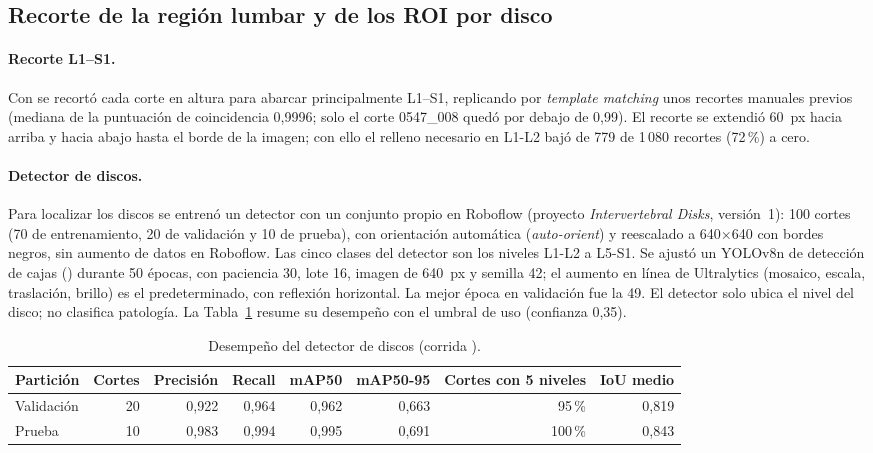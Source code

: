 \subsection{Recorte de la región lumbar y de los ROI por disco}
\label{sec:roi}
\paragraph{Recorte L1--S1.} Con  se recortó cada corte en altura para abarcar principalmente L1--S1, replicando por \emph{template matching} unos recortes manuales previos (mediana de la puntuación de coincidencia 0,9996; solo el corte 0547\_008 quedó por debajo de 0,99). El recorte se extendió 60~px hacia arriba y hacia abajo hasta el borde de la imagen; con ello el relleno necesario en L1-L2 bajó de 779 de 1\,080 recortes (72\,\%) a cero.

\paragraph{Detector de discos.} Para localizar los discos se entrenó un detector con un conjunto propio en Roboflow (proyecto \emph{Intervertebral Disks}, versión~1): 100 cortes (70 de entrenamiento, 20 de validación y 10 de prueba), con orientación automática (\emph{auto-orient}) y reescalado a 640$\times$640 con bordes negros, sin aumento de datos en Roboflow. Las cinco clases del detector son los niveles L1-L2 a L5-S1. Se ajustó un YOLOv8n de detección de cajas () durante 50 épocas, con paciencia 30, lote 16, imagen de 640~px y semilla 42; el aumento en línea de Ultralytics (mosaico, escala, traslación, brillo) es el predeterminado, con reflexión horizontal. La mejor época en validación fue la 49. El detector solo ubica el nivel del disco; no clasifica patología. La Tabla~\ref{tab:detector} resume su desempeño con el umbral de uso (confianza 0,35).

\begin{table}[t]
\centering\small
\caption{Desempeño del detector de discos (corrida ).}
\label{tab:detector}
\begin{tabular}{lrrrrrrr}
\toprule
Partición & Cortes & Precisión & Recall & mAP50 & mAP50-95 & Cortes con 5 niveles & IoU medio \\
\midrule
Validación & 20 & 0,922 & 0,964 & 0,962 & 0,663 & 95\,\% & 0,819 \\
Prueba     & 10 & 0,983 & 0,994 & 0,995 & 0,691 & 100\,\% & 0,843 \\
\bottomrule
\end{tabular}
\end{table}

